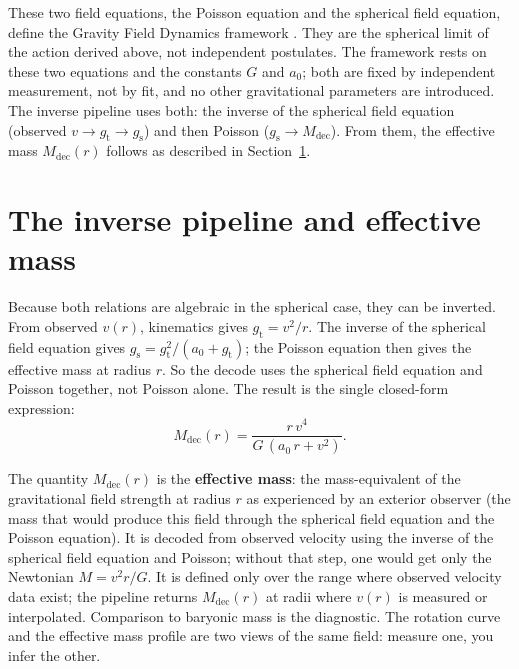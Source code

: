 \documentclass[aps,twocolumn,amsmath,amssymb,reprint,nofootinbib,nobalancelastpage]{revtex4-2}
\begin{document}
These two field equations, the Poisson equation and the spherical field equation, define the Gravity Field Dynamics framework \cite{Nelson2026}. They are the spherical limit of the action derived above, not independent postulates. The framework rests on these two equations and the constants $G$ and $a_0$; both are fixed by independent measurement, not by fit, and no other gravitational parameters are introduced. The inverse pipeline uses both: the inverse of the spherical field equation (observed $v \to g_{\mathrm{t}} \to g_{\mathrm{s}}$) and then Poisson ($g_{\mathrm{s}} \to M_{\mathrm{dec}}$). From them, the effective mass $M_{\mathrm{dec}}(r)$ follows as described in Section~\ref{sec:inverse}.

\section{The inverse pipeline and effective mass}
\label{sec:inverse}

Because both relations are algebraic in the spherical case, they can be inverted. From observed $v(r)$, kinematics gives $g_{\mathrm{t}} = v^2/r$. The inverse of the spherical field equation gives $g_{\mathrm{s}} = g_{\mathrm{t}}^2/(a_0 + g_{\mathrm{t}})$; the Poisson equation then gives the effective mass at radius $r$. So the decode uses the spherical field equation and Poisson together, not Poisson alone. The result is the single closed-form expression:
\begin{equation}
M_{\mathrm{dec}}(r) = \frac{r\,v^4}{G\,(a_0\,r + v^2)}.
\label{eq:Mdec}
\end{equation}

The quantity $M_{\mathrm{dec}}(r)$ is the \textbf{effective mass}: the mass-equivalent of the gravitational field strength at radius $r$ as experienced by an exterior observer (the mass that would produce this field through the spherical field equation and the Poisson equation). It is decoded from observed velocity using the inverse of the spherical field equation and Poisson; without that step, one would get only the Newtonian $M = v^2 r/G$. It is defined only over the range where observed velocity data exist; the pipeline returns $M_{\mathrm{dec}}(r)$ at radii where $v(r)$ is measured or interpolated. Comparison to baryonic mass is the diagnostic. The rotation curve and the effective mass profile are two views of the same field: measure one, you infer the other.
\end{document}
